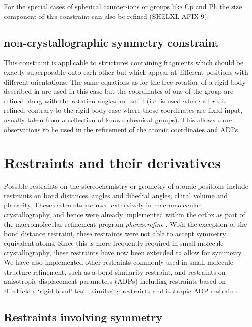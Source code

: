 \documentclass[pdf]{iucr}
\begin{document}
For the special cases of spherical counter-ions or groups like Cp and Ph the size component of this constraint can also be refined (SHELXL AFIX 9).

\subsection{non-crystallographic symmetry constraint}
This constraint is applicable to structures containing fragments which should be exactly superposable onto each other but which appear at different positions with different orientations.
The same equations as for the free rotation of a rigid body described in  are used in this case but the coordinates of one of the group are refined along with the rotation angles and shift (i.e.  is used where all $r$'s is refined, contrary to the rigid body case where those coordinates are fixed input, usually taken from a collection of known chemical groups). This allows more observations to be used in the refinement of the atomic coordinates and ADPs.


\section{Restraints and their derivatives}

Possible restraints on the stereochemistry or geometry of atomic positions include restraints on bond distances, angles and dihedral angles, chiral volume and planarity. These restraints are used extensively in macromolecular crystallography, and hence were already implemented within the cctbx as part of the macromolecular refinement program \emph{phenix.refine} \cite{Afonine:2012aa}. With the exception of the bond distance restraint, these restraints were not able to accept symmetry equivalent atoms. Since this is more frequently required in small molecule crystallography, these restraints have now been extended to allow for symmetry. We have also implemented other restraints commonly used in small molecule structure refinement, such as a bond similarity restraint, and restraints on anisotropic displacement parameters (ADPs) including restraints based on Hirshfeld's `rigid-bond' test \cite{Hirshfeld:1976aa}, similarity restraints and isotropic ADP restraints.

\subsection{Restraints involving symmetry}
\end{document}
